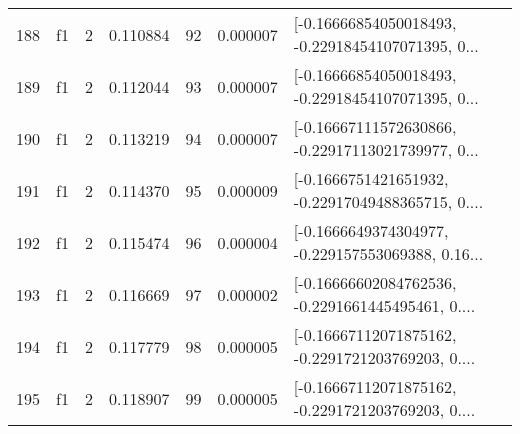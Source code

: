 \begin{tabular}{lllrlrl}
188 &  f1 &   2 &  0.110884 &   92 &  0.000007 &  [-0.16666854050018493, -0.22918454107071395, 0... \\
189 &  f1 &   2 &  0.112044 &   93 &  0.000007 &  [-0.16666854050018493, -0.22918454107071395, 0... \\
190 &  f1 &   2 &  0.113219 &   94 &  0.000007 &  [-0.16667111572630866, -0.22917113021739977, 0... \\
191 &  f1 &   2 &  0.114370 &   95 &  0.000009 &  [-0.1666751421651932, -0.22917049488365715, 0.... \\
192 &  f1 &   2 &  0.115474 &   96 &  0.000004 &  [-0.1666649374304977, -0.229157553069388, 0.16... \\
193 &  f1 &   2 &  0.116669 &   97 &  0.000002 &  [-0.16666602084762536, -0.2291661445495461, 0.... \\
194 &  f1 &   2 &  0.117779 &   98 &  0.000005 &  [-0.16667112071875162, -0.2291721203769203, 0.... \\
195 &  f1 &   2 &  0.118907 &   99 &  0.000005 &  [-0.16667112071875162, -0.2291721203769203, 0.... \\
\bottomrule
\end{tabular}
